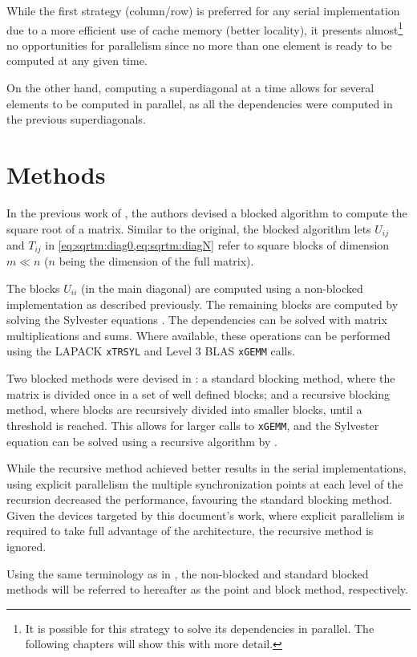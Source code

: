 \documentclass[../thesis]{subfiles}
\begin{document}
		While the first strategy (column/row) is preferred for any serial implementation due to a more efficient use of cache memory (better locality), it presents almost\footnote{It is possible for this strategy to solve its dependencies in parallel. The following chapters will show this with more detail.} no opportunities for parallelism since no more than one element is ready to be computed at any given time.

		On the other hand, computing a superdiagonal at a time allows for several elements to be computed in parallel, as all the dependencies were computed in the previous superdiagonals.

	\section{Methods}
		In the previous work of \citeauthor{Deadman:Higham:Ralha:2012}\xspace\cite{Deadman:Higham:Ralha:2012}, the authors devised a blocked algorithm to compute the square root of a matrix. Similar to the original, the blocked algorithm lets $U_{ij}$ and $T_{ij}$ in \cref{eq:sqrtm:diag0,eq:sqrtm:diagN} refer to square blocks of dimension $m \ll n$ ($n$ being the dimension of the full matrix).

		The blocks $U_{ii}$ (in the main diagonal) are computed using a non-blocked implementation as described previously.
		The remaining blocks are computed by solving the Sylvester equations .
		The dependencies can be solved with matrix multiplications and sums.
		Where available, these operations can be performed using the LAPACK \texttt{xTRSYL} and Level 3 BLAS \texttt{xGEMM} calls.

		Two blocked methods were devised in \cite{Deadman:Higham:Ralha:2012}: a standard blocking method, where the matrix is divided once in a set of well defined blocks; and a recursive blocking method, where blocks are recursively divided into smaller blocks, until a threshold is reached. This allows for larger calls to \texttt{xGEMM}, and the Sylvester equation can be solved using a recursive algorithm by \cite{Jonsson:Kagstrom:2002}.

		While the recursive method achieved better results in the serial implementations, using explicit parallelism the multiple synchronization points at each level of the recursion decreased the performance, favouring the standard blocking method. Given the devices targeted by this document's work, where explicit parallelism is required to take full advantage of the architecture, the recursive method is ignored.

		Using the same terminology as in \cite{Deadman:Higham:Ralha:2012}, the non-blocked and standard blocked methods will be referred to hereafter as the point and block method, respectively.
\end{document}
